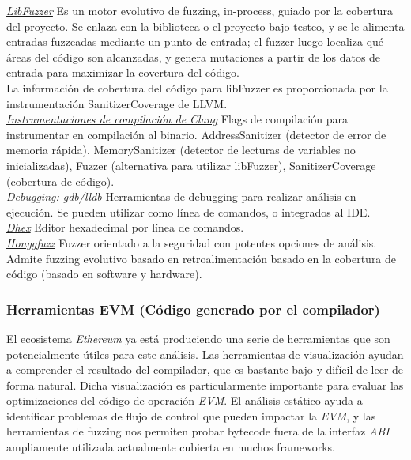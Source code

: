 \underline{\textit{LibFuzzer}}\cite{LibFuzzerLink}
Es un motor evolutivo de fuzzing, in-process, guiado por la cobertura del proyecto. Se enlaza con la biblioteca o el proyecto bajo testeo, y se le alimenta entradas fuzzeadas mediante un punto de entrada; el fuzzer luego localiza qué áreas del código son alcanzadas, y genera mutaciones a partir de los datos de entrada para maximizar la covertura del código.\\
La información de cobertura del código para libFuzzer es proporcionada por la instrumentación SanitizerCoverage de LLVM.\\

\underline{\textit{Instrumentaciones de compilación de Clang}}\cite{ClangInstrumentationLink}
Flags de compilación para instrumentar en compilación al binario.
AddressSanitizer\cite{AddressSanitizerLink} (detector de error de memoria rápida), MemorySanitizer\cite{MemorySanitizerLink} (detector de lecturas de variables no inicializadas), Fuzzer (alternativa para utilizar libFuzzer), SanitizerCoverage\cite{SanitizerCoverageLink} (cobertura de código).\\

\underline{\textit{Debugging: gdb/lldb\cite{gdbLink}\cite{lldbLink}}}
Herramientas de debugging para realizar análisis en ejecución. Se pueden utilizar como línea de comandos, o integrados al IDE.\\

\underline{\textit{Dhex}}\cite{DhexLink}
Editor hexadecimal por línea de comandos.\\

\underline{\textit{Honggfuzz}}\cite{HonggfuzzLink}
Fuzzer orientado a la seguridad con potentes opciones de análisis. Admite fuzzing evolutivo basado en retroalimentación basado en la cobertura de código (basado en software y hardware).

\subsubsection{Herramientas EVM (Código generado por el compilador)}

El ecosistema \textit{Ethereum} ya está produciendo una serie de herramientas que son potencialmente útiles para este análisis. Las herramientas de visualización ayudan a comprender el resultado del compilador, que es bastante bajo y difícil de leer de forma natural. Dicha visualización es particularmente importante para evaluar las optimizaciones del código de operación \textit{EVM}. El análisis estático ayuda a identificar problemas de flujo de control que pueden impactar la \textit{EVM}, y las herramientas de fuzzing nos permiten probar bytecode fuera de la interfaz \textit{ABI} ampliamente utilizada actualmente cubierta en muchos frameworks.\\

